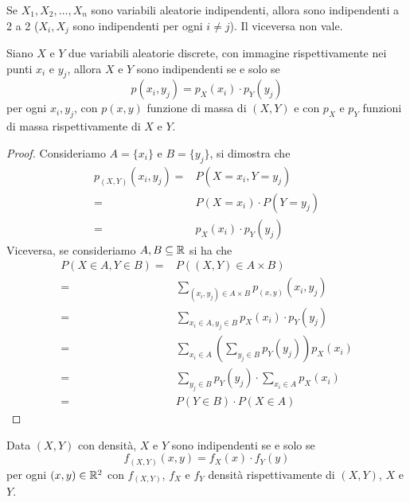 \begin{observation}
	Se $X_1, X_2, \dots, X_n$ sono variabili aleatorie indipendenti, allora sono indipendenti a 2
	a 2 ($X_i, X_j$ sono indipendenti per ogni $i \neq j$). Il viceversa non vale.
\end{observation}

\begin{proposition}
	Siano $X$ e $Y$ due variabili aleatorie discrete, con immagine rispettivamente nei punti $x_i$
	e $y_j$, allora $X$ e $Y$ sono indipendenti se e solo se
	\[ p(x_i, y_j) = p_X (x_i) \cdot p_Y (y_j) \]
	per ogni $x_i, y_j$, con $p(x,y)$ funzione di massa di $(X, Y)$ e con $p_X$ e $p_Y$ funzioni di
	massa rispettivamente di $X$ e $Y$.
	\begin{proof}
		Consideriamo $A = \{ x_i \}$ e $B = \{ y_j \}$, si dimostra che
		\begin{align*}
			p_{(X,Y)} (x_i, y_j) = & P(X = x_i, Y = y_j)         \\
			=                      & P(X = x_i) \cdot P(Y = y_j) \\
			=                      & p_X (x_i) \cdot p_Y (y_j)
		\end{align*}
		Viceversa, se consideriamo $A,B\subseteq \mathbb{R}$ si ha che
		\begin{align*}
			P(X \in A, Y \in B) = & P((X,Y) \in A \times B)                                    \\
			=                     & \sum_{(x_i, y_j) \in A \times B} p_{(x,y)} (x_i, y_j)      \\
			=                     & \sum_{x_i \in A, y_j \in B} p_X(x_i) \cdot p_Y(y_j)        \\
			=                     & \sum_{x_i \in A} \left( \sum_{y_j \in B} p_Y(y_j) \right)
			p_X(x_i)                                                                           \\
			=                     & \sum_{y_j \in B} p_Y(y_j) \cdot \sum_{x_i \in A} p_X (x_i) \\
			=                     & P(Y \in B) \cdot P(X \in A)
		\end{align*}
	\end{proof}
\end{proposition}

\begin{proposition}
	Data $(X, Y)$ con densità, $X$ e $Y$ sono indipendenti se e solo se
	\[ f_{(X,Y)} (x,y) = f_X (x) \cdot f_Y (y) \]
	per ogni $(x, y) \in \mathbb{R}^2$ con $f_{(X,Y)}$, $f_X$ e $f_Y$ densità rispettivamente di
	$(X,Y)$, $X$ e $Y$.
\end{proposition}

